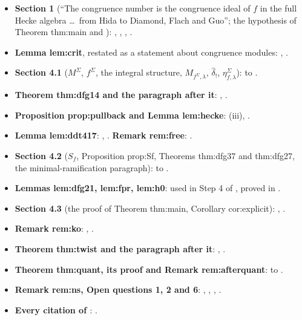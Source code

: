 \begin{itemize}
\item \textbf{Section 1} (``The congruence number is the congruence ideal of $f$ in the full Hecke algebra \dots\ from Hida to Diamond, Flach and Guo''; the hypothesis of Theorem thm:main and
\cite[Theorem 0.1]{DFG04}): , , , .
\item \textbf{Lemma lem:crit}, restated as a statement about congruence modules: , .
\item \textbf{Section 4.1} ($M^\Sigma$, $f^\Sigma$, the integral structure, $M_{f^\Sigma,\lambda}$, $\hat\delta_!$, $\eta^\Sigma_{f,\lambda}$):  to .
\item \textbf{Theorem thm:dfg14 and the paragraph after it}: , .
\item \textbf{Proposition prop:pullback and Lemma lem:hecke}: (iii), .
\item \textbf{Lemma lem:ddt417}: , . \textbf{Remark rem:free}: .
\item \textbf{Section 4.2} ($S_f$, Proposition prop:Sf, Theorems thm:dfg37 and thm:dfg27, the minimal-ramification paragraph):  to .
\item \textbf{Lemmas lem:dfg21, lem:fpr, lem:h0}: used in Step 4 of , proved in .
\item \textbf{Section 4.3} (the proof of Theorem thm:main, Corollary cor:explicit): , .
\item \textbf{Remark rem:ko}: , .
\item \textbf{Theorem thm:twist and the paragraph after it}: , .
\item \textbf{Theorem thm:quant, its proof and Remark rem:afterquant}:  to .
\item \textbf{Remark rem:ns, Open questions 1, 2 and 6}: , , , .
\item \textbf{Every citation of \cite{DFG04}}: .
\end{itemize}

